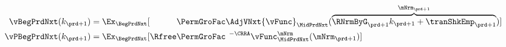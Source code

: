   \begin{equation}\begin{gathered}\begin{aligned}
        \vBegPrdNxt({k}_{\prd+1})    & = \Ex_{\BegPrdNxt}[\phantom{\Rfree}\PermGroFac\AdjVNxt {\vFunc}_{\MidPrdNxt}(\overbrace{\RNrmByG_{\prd+1}{k}_{\prd+1}+{\tranShkEmp}_{\prd+1}}^{\mNrm_{\prd+1}})] \label{eq:vFuncBegtpdefn} \\
        \vPBegPrdNxt({k}_{\prd+1}) & = \Ex_{\BegPrdNxt}[\Rfree \PermGroFac^{\phantom{1}-\CRRA} {\vFunc}_{\MidPrdNxt}^{\mNrm}(\mNrm_{\prd+1})]
      \end{aligned}\end{gathered}\end{equation}
